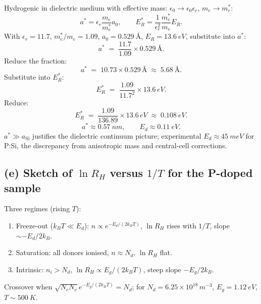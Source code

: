 \documentclass[11pt]{article}
\begin{document}
Hydrogenic in dielectric medium with effective mass: $\epsilon_0\to\epsilon_0\epsilon_r$, $m_e\to m_e^*$:
\begin{equation}
a^{*} = \epsilon_r\frac{m_e}{m_e^{*}}a_0,\qquad E^{*}_R = \frac{1}{\epsilon_r^{2}}\frac{m_e^{*}}{m_e}E_R.
\label{eq:donscale}
\end{equation}
With $\epsilon_r=11.7$, $m_e^*/m_e=1.09$, $a_0=\SI{0.529}{\angstrom}$, $E_R=\SI{13.6}{eV}$, substitute into $a^*$:
\[
a^* \;=\; \frac{11.7}{1.09}\times 0.529\,\si{\angstrom}.
\]
Reduce the fraction:
\[
a^* \;=\; 10.73\times 0.529\,\si{\angstrom} \;\approx\; \SI{5.68}{\angstrom}.
\]
Substitute into $E^*_R$:
\[
E^*_R \;=\; \frac{1.09}{11.7^2}\times 13.6\,\si{eV}.
\]
Reduce:
\[
E^*_R \;=\; \frac{1.09}{136.89}\times 13.6\,\si{eV} \;\approx\; \SI{0.108}{eV}.
\]
\begin{equation}
\boxed{\;a^{*} \approx \SI{0.57}{nm},\qquad E_d \approx \SI{0.11}{eV}.\;}
\label{eq:donbox}
\end{equation}
$a^*\gg a_{\text{Si}}$ justifies the dielectric continuum picture; experimental $E_d\approx \SI{45}{meV}$ for P:Si, the discrepancy from anisotropic mass and central-cell corrections.

\subsection*{(e) Sketch of $\ln R_H$ versus $1/T$ for the P-doped sample}

Three regimes (rising $T$):
\begin{enumerate}
\item Freeze-out ($k_BT\ll E_d$): $n\propto e^{-E_d/(2k_BT)}$, $\ln R_H$ rises with $1/T$, slope $\sim -E_d/2k_B$.
\item Saturation: all donors ionised, $n\approx N_d$, $\ln R_H$ flat.
\item Intrinsic: $n_i>N_d$, $\ln R_H\propto E_g/(2k_BT)$, steep slope $-E_g/2k_B$.
\end{enumerate}
Crossover when $\sqrt{N_cN_v}e^{-E_g/(2k_BT)}=N_d$; for $N_d=6.25\times 10^{18}\,\si{m^{-3}}$, $E_g=\SI{1.12}{eV}$, $T\sim \SI{500}{K}$.
\end{document}
